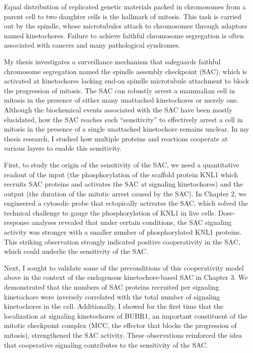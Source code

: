 Equal distribution of replicated genetic materials packed in chromosomes from a parent cell to two daughter cells is the hallmark of mitosis. This task is carried out by the spindle, whose microtubules attach to chromosomes through adaptors named kinetochores. Failure to achieve faithful chromosome segregation is often associated with cancers and many pathological syndromes.

My thesis investigates a surveillance mechanism that safeguards faithful chromosome segregation named the spindle assembly checkpoint (SAC), which is activated at kinetochores lacking end-on spindle microtubule attachment to block the progression of mitosis. The SAC can robustly arrest a mammalian cell in mitosis in the presence of either many unattached kinetochores or merely one. Although the biochemical events associated with the SAC have been mostly elucidated, how the SAC reaches such ``sensitivity'' to effectively arrest a cell in mitosis in the presence of a single unattached kinetochore remains unclear. In my thesis research, I studied how multiple proteins and reactions cooperate at various layers to enable this sensitivity.

First, to study the origin of the sensitivity of the SAC, we need a quantitative readout of the input (the phosphorylation of the scaffold protein KNL1 which recruits SAC proteins and activates the SAC at signaling kinetochores) and the output (the duration of the mitotic arrest caused by the SAC). In Chapter 2, we engineered a cytosolic probe that ectopically activates the SAC, which solved the technical challenge to gauge the phosphorylation of KNL1 in live cells. Dose-response analyses revealed that under certain conditions, the SAC signaling activity was stronger with a smaller number of phosphorylated KNL1 proteins. This striking observation strongly indicated positive cooperativity in the SAC, which could underlie the sensitivity of the SAC.

Next, I sought to validate some of the preconditions of this cooperativity model above in the context of the endogenous kinetochore-based SAC in Chapter 3. We demonstrated %
that the numbers of SAC proteins recruited per signaling kinetochore were inversely correlated with the total number of signaling kinetochores in the cell. Additionally, I showed for the first time that the localization at signaling kinetochores of BUBR1, an important constituent of the mitotic checkpoint complex (MCC, the effector that blocks the progression of mitosis), strengthened the SAC activity. These observations reinforced the idea that cooperative signaling contributes to the sensitivity of the SAC.

